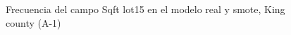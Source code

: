 \begin{figure}[H]
    \centering
    
    \caption{Frecuencia del campo Sqft lot15 en el modelo real y smote, King county (A-1)}
    \label{frecuency-smote-sqft lot15}
\end{figure}